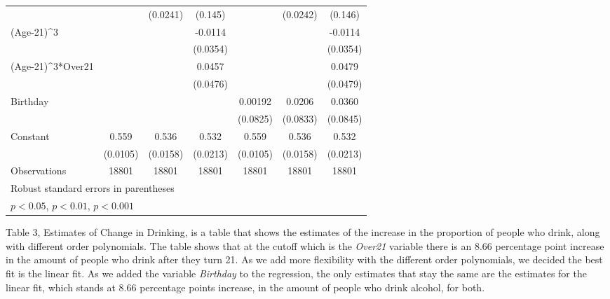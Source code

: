 \documentclass[a4paper]{article}
\begin{document}
\begin{table}[H]
{\begin{tabular}{l*{6}{c}}
                    &                     &    (0.0241)         &     (0.145)         &                     &    (0.0242)         &     (0.146)         \\
[1em]
(Age-21)^3          &                     &                     &     -0.0114         &                     &                     &     -0.0114         \\
                    &                     &                     &    (0.0354)         &                     &                     &    (0.0354)         \\
[1em]
(Age-21)^3*Over21   &                     &                     &      0.0457         &                     &                     &      0.0479         \\
                    &                     &                     &    (0.0476)         &                     &                     &    (0.0479)         \\
[1em]
Birthday            &                     &                     &                     &     0.00192         &      0.0206         &      0.0360         \\
                    &                     &                     &                     &    (0.0825)         &    (0.0833)         &    (0.0845)         \\
[1em]
Constant            &       0.559\sym{***}&       0.536\sym{***}&       0.532\sym{***}&       0.559\sym{***}&       0.536\sym{***}&       0.532\sym{***}\\
                    &    (0.0105)         &    (0.0158)         &    (0.0213)         &    (0.0105)         &    (0.0158)         &    (0.0213)         \\
\hline
Observations        &       18801         &       18801         &       18801         &       18801         &       18801         &       18801         \\
\hline\hline
\multicolumn{7}{l}{\footnotesize Robust standard errors in parentheses}\\
\multicolumn{7}{l}{\footnotesize \sym{*} \(p<0.05\), \sym{**} \(p<0.01\), \sym{***} \(p<0.001\)}\\
\end{tabular}}
\label{tab:my_label}
\end{table}

\par
Table 3, Estimates of Change in Drinking, is a table that shows the estimates of the increase in the proportion of people who drink, along with different order polynomials. The table shows that at the cutoff which is the \textit{Over21} variable there is an 8.66 percentage point increase in the amount of people who drink after they turn 21. As we add more flexibility with the different order polynomials, we decided the best fit is the linear fit. As we added the variable \textit{Birthday} to the regression, the only estimates that stay the same are the estimates for the linear fit, which stands at 8.66 percentage points increase, in the amount of people who drink alcohol, for both.
\end{document}
